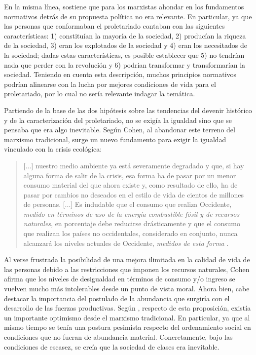 En la misma línea, \citet{Cohen_2001} sostiene que para los marxistas ahondar en los fundamentos normativos detrás de su propuesta política no era relevante. En particular, ya que las personas que conformaban el proletariado contaban con las siguientes características: 1) constituían la mayoría de  la sociedad, 2) producían la riqueza de la sociedad, 3) eran los explotados de la sociedad y 4) eran los necesitados de la sociedad; dadas estas características, es posible establecer que 5) no tendrían nada que perder con la revolución y 6) podrían transformar y transformarían la sociedad. Teniendo en cuenta esta descripción, muchos principios normativos podrían alinearse con la lucha por mejores condiciones de vida para el proletariado, por lo cual no sería relevante indagar la temática.

Partiendo de la base de las dos hipótesis sobre las tendencias del devenir histórico y de la caracterización del proletariado, no se exigía la igualdad sino que se pensaba que era algo inevitable. Según Cohen, al abandonar este terreno del marxismo tradicional, surge un nuevo fundamento para exigir la igualdad vinculado con la crisis ecológica:

\vspace{3mm}
\begin{quote}
    [...] nuestro medio ambiente ya está severamente degradado y que, si hay alguna forma de salir de la crisis, esa forma ha de pasar por un menor consumo material del que ahora existe y, como resultado de ello, ha de pasar por cambios no deseados en el estilo de vida de cientos de millones de personas. [...] Es indudable que el consumo que realiza Occidente, \textit{medido en términos de uso de la energía combustible fósil y de recursos naturales}, en porcentaje debe reducirse drásticamente y que el consumo que realizan los países no occidentales, considerado en conjunto, nunca alcanzará los niveles actuales de Occidente, \textit{medidos de esta forma} \citep[p. 152-153]{Cohen_2001}.
\end{quote}
\vspace{3mm}

Al verse frustrada la posibilidad de una mejora ilimitada en la calidad de vida de las personas debido a las restricciones que imponen los recursos naturales, Cohen afirma que los niveles de desigualdad en términos de consumo y/o ingreso se vuelven mucho más intolerables desde un punto de vista moral. Ahora bien, cabe destacar la importancia del postulado de la abundancia que surgiría con el desarrollo de las fuerzas productivas. Según \citet{Cohen_2001}, respecto de esta proposición, existía un importante optimismo desde el marxismo tradicional. En particular, ya que al mismo tiempo se tenía una postura pesimista respecto del ordenamiento social en condiciones que no fueran de abundancia material. Concretamente, bajo las condiciones de escasez, se creía que la sociedad de clases era inevitable.


